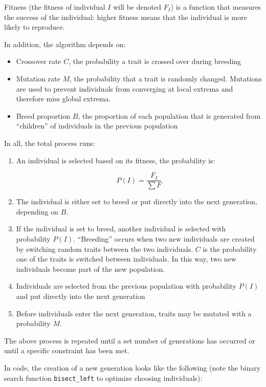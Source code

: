 \documentclass[11pt,a4paper]{article}
\begin{document}
Fitness (the fitness of individual $I$ will be denoted $F_{I}$) is a function that measures the success of the individual: higher fitness means that the individual is more likely to reproduce.

In addition, the algorithm depends on:
\begin{itemize}
\item Crossover rate $C$, the probability a trait is crossed over during breeding
\item Mutation rate $M$, the probability that a trait is randomly changed. Mutations are used to prevent individuals from converging at local extrema and therefore miss global extrema.
\item Breed proportion $B$, the proportion of each population that is generated from ``children'' of individuals in the previous population
\end{itemize}

In all, the total process runs:

\begin{enumerate}
\item An individual is selected based on its fitness, the probability is:

\[
P(I) = \frac{F_{I}}{\sum{F}}
\]

\item The individual is either set to breed or put directly into the next generation, depending on $B$.
\item If the individual is set to breed, another individual is selected with probability $P(I)$. ``Breeding'' occurs when two new individuals are created by switching random traits between the two individuals. $C$ is the probability one of the traits is switched between individuals. In this way, two new individuals become part of the new population.
\item Individuals are selected from the previous population with probability $P(I)$ and put directly into the next generation
\item Before individuals enter the next generation, traits may be mutated with a probability $M$. 
\end{enumerate}

The above process is repeated until a set number of generations has occurred or until a specific constraint has been met.

In code, the creation of a new generation looks like the following (note the binary search function \verb|bisect_left| to optimize choosing individuals):
\end{document}
